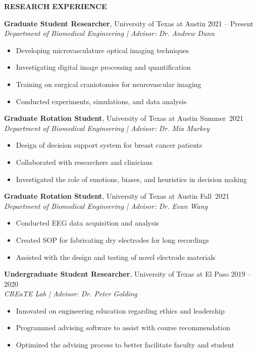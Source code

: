 \documentclass[11pt]{article}
\newcommand{\sectionheading}[1]{%
    \vspace{1.6ex}%
    {\large\bfseries\MakeUppercase{#1}}\par\vspace{0.8ex}%
  }
\newcommand{\sectionheading}[1]{%
    \vspace{1.6ex}%
    {\large\bfseries{\SansHead \MakeUppercase{#1}}}\par\vspace{0.8ex}%
  }
\begin{document}
\sectionheading{Research Experience}

\textbf{Graduate Student Researcher}, University of Texas at Austin \hfill 2021 -- Present\\
\textit{Department of Biomedical Engineering \;|\; Advisor: Dr. Andrew Dunn}
\begin{itemize}
  \item Developing microvasculature optical imaging techniques
  \item Investigating digital image processing and quantification
  \item Training on surgical craniotomies for neurovascular imaging
  \item Conducted experiments, simulations, and data analysis
\end{itemize}

\textbf{Graduate Rotation Student}, University of Texas at Austin \hfill Summer~2021\\
\textit{Department of Biomedical Engineering \;|\; Advisor: Dr. Mia Markey}
\begin{itemize}
  \item Design of decision support system for breast cancer patients
  \item Collaborated with researchers and clinicians
  \item Investigated the role of emotions, biases, and heuristics in decision making
\end{itemize}

\textbf{Graduate Rotation Student}, University of Texas at Austin \hfill Fall~2021\\
\textit{Department of Biomedical Engineering \;|\; Advisor: Dr. Evan Wang}
\begin{itemize}
  \item Conducted EEG data acquisition and analysis
  \item Created SOP for fabricating dry electrodes for long recordings
  \item Assisted with the design and testing of novel electrode materials
\end{itemize}

\textbf{Undergraduate Student Researcher}, University of Texas at El Paso \hfill 2019 -- 2020\\
\textit{CREaTE Lab \;|\; Advisor: Dr. Peter Golding}
\begin{itemize}
  \item Innovated on engineering education regarding ethics and leadership
  \item Programmed advising software to assist with course recommendation
  \item Optimized the advising process to better facilitate faculty and student
\end{itemize}
\end{document}
